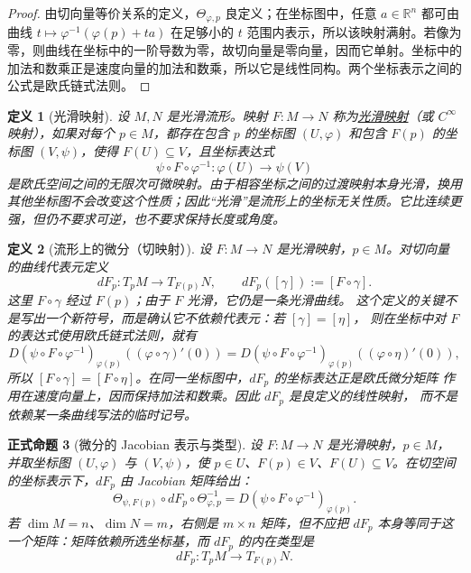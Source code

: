 \documentclass[UTF8,fontset=none,a4paper,11pt]{ctexart}
\theoremstyle{foundation-definition}
\newtheorem{definition}{定义}[section]
\theoremstyle{foundation-theorem}
\theoremstyle{foundation-proposition}
\newtheorem{proposition}[definition]{正式命题}
\theoremstyle{foundation-example}
\theoremstyle{foundation-remark}
\theoremstyle{foundation-theorem}
\newcommand{\term}[2]{\hyperref[#1]{#2}}
\begin{document}
\begin{proof}
由切向量等价关系的定义，\(\Theta_{\varphi,p}\) 良定义；在坐标图中，任意 \(a\in\mathbb R^n\) 都可由曲线
\(t\mapsto\varphi^{-1}(\varphi(p)+ta)\) 在足够小的 \(t\) 范围内表示，所以该映射满射。若像为零，则曲线在坐标中的一阶导数为零，故切向量是零向量，因而它单射。坐标中的加法和数乘正是速度向量的加法和数乘，所以它是线性同构。两个坐标表示之间的公式是欧氏链式法则。
\end{proof}

\begin{definition}[光滑映射]\label{def:smooth-map}
设 \(M,N\) 是光滑流形。映射 \(F:M\to N\) 称为\term{def:smooth-map}{光滑映射}（或 \(C^\infty\) 映射），如果对每个 \(p\in M\)，都存在包含 \(p\) 的坐标图 \((U,\varphi)\) 和包含 \(F(p)\) 的坐标图 \((V,\psi)\)，使得 \(F(U)\subseteq V\)，且坐标表达式
\[
 \psi\circ F\circ\varphi^{-1}:
 \varphi(U)\longrightarrow\psi(V)
\]
是欧氏空间之间的无限次可微映射。由于相容坐标之间的过渡映射本身光滑，换用其他坐标图不会改变这个性质；因此“光滑”是流形上的坐标无关性质。它比连续更强，但仍不要求可逆，也不要求保持长度或角度。
\end{definition}

\begin{definition}[流形上的微分（切映射）]\label{def:manifold-differential}
设 \(F:M\to N\) 是光滑映射，\(p\in M\)。对切向量的曲线代表元定义
\[
dF_p:T_pM\longrightarrow T_{F(p)}N,
\qquad
dF_p([\gamma]):=[F\circ\gamma].
\]
这里 \(F\circ\gamma\) 经过 \(F(p)\)；由于 \(F\) 光滑，它仍是一条光滑曲线。
这个定义的关键不是写出一个新符号，而是确认它不依赖代表元：若 \([\gamma]=[\eta]\)，
则在坐标中对 \(F\) 的表达式使用欧氏链式法则，就有
\[
D(\psi\circ F\circ\varphi^{-1})_{\varphi(p)}
\left((\varphi\circ\gamma)'(0)\right)
=D(\psi\circ F\circ\varphi^{-1})_{\varphi(p)}
\left((\varphi\circ\eta)'(0)\right),
\]
所以 \([F\circ\gamma]=[F\circ\eta]\)。在同一坐标图中，\(dF_p\) 的坐标表达正是欧氏微分矩阵
作用在速度向量上，因而保持加法和数乘。因此 \(dF_p\) 是良定义的线性映射，
而不是依赖某一条曲线写法的临时记号。
\end{definition}

\begin{proposition}[微分的 Jacobian 表示与类型]\label{prop:differential-coordinate-matrix}
设 \(F:M\to N\) 是光滑映射，\(p\in M\)，并取坐标图 \((U,\varphi)\) 与 \((V,\psi)\)，使 \(p\in U\)、\(F(p)\in V\)、\(F(U)\subseteq V\)。在切空间的坐标表示下，\(dF_p\) 由 Jacobian 矩阵给出：
\[
\Theta_{\psi,F(p)}\circ dF_p\circ\Theta_{\varphi,p}^{-1}
=D(\psi\circ F\circ\varphi^{-1})_{\varphi(p)}.
\]
若 \(\dim M=n\)、\(\dim N=m\)，右侧是 \(m\times n\) 矩阵，但不应把 \(dF_p\) 本身等同于这一个矩阵：矩阵依赖所选坐标基，而 \(dF_p\) 的内在类型是
\[
dF_p:T_pM\longrightarrow T_{F(p)}N.
\]
\end{proposition}
\end{document}
